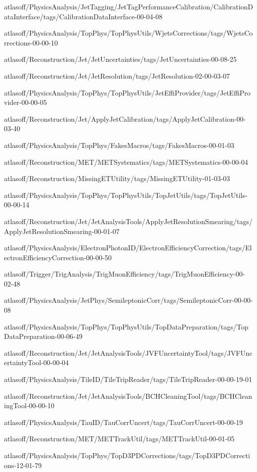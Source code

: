 atlasoff/PhysicsAnalysis/JetTagging/JetTagPerformanceCalibration/CalibrationDataInterface/tags/CalibrationDataInterface-00-04-08

atlasoff/PhysicsAnalysis/TopPhys/TopPhysUtils/WjetsCorrections/tags/WjetsCorrections-00-00-10

atlasoff/Reconstruction/Jet/JetUncertainties/tags/JetUncertainties-00-08-25

atlasoff/Reconstruction/Jet/JetResolution/tags/JetResolution-02-00-03-07

atlasoff/PhysicsAnalysis/TopPhys/TopPhysUtils/JetEffiProvider/tags/JetEffiProvider-00-00-05

atlasoff/Reconstruction/Jet/ApplyJetCalibration/tags/ApplyJetCalibration-00-03-40

atlasoff/PhysicsAnalysis/TopPhys/FakesMacros/tags/FakesMacros-00-01-03

atlasoff/Reconstruction/MET/METSystematics/tags/METSystematics-00-00-04

atlasoff/Reconstruction/MissingETUtility/tags/MissingETUtility-01-03-03

atlasoff/PhysicsAnalysis/TopPhys/TopPhysUtils/TopJetUtils/tags/TopJetUtils-00-00-14

atlasoff/Reconstruction/Jet/JetAnalysisTools/ApplyJetResolutionSmearing/tags/ApplyJetResolutionSmearing-00-01-07

atlasoff/PhysicsAnalysis/ElectronPhotonID/ElectronEfficiencyCorrection/tags/ElectronEfficiencyCorrection-00-00-50

atlasoff/Trigger/TrigAnalysis/TrigMuonEfficiency/tags/TrigMuonEfficiency-00-02-48

atlasoff/PhysicsAnalysis/JetPhys/SemileptonicCorr/tags/SemileptonicCorr-00-00-08

atlasoff/PhysicsAnalysis/TopPhys/TopPhysUtils/TopDataPreparation/tags/TopDataPreparation-00-06-49

atlasoff/Reconstruction/Jet/JetAnalysisTools/JVFUncertaintyTool/tags/JVFUncertaintyTool-00-00-04

atlasoff/PhysicsAnalysis/TileID/TileTripReader/tags/TileTripReader-00-00-19-01

atlasoff/Reconstruction/Jet/JetAnalysisTools/BCHCleaningTool/tags/BCHCleaningTool-00-00-10

atlasoff/PhysicsAnalysis/TauID/TauCorrUncert/tags/TauCorrUncert-00-00-19

atlasoff/Reconstruction/MET/METTrackUtil/tags/METTrackUtil-00-01-05

atlasoff/PhysicsAnalysis/TopPhys/TopD3PDCorrections/tags/TopD3PDCorrections-12-01-79

